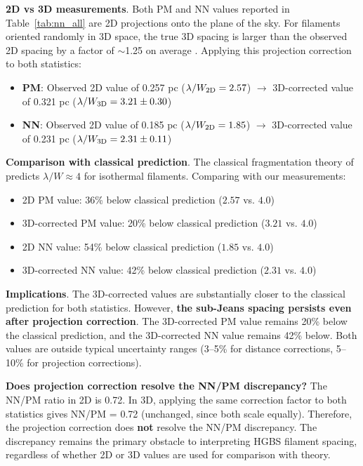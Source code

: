 \documentclass[twoside,twocolumn]{mnras}
\begin{document}
\textbf{2D vs 3D measurements}. Both PM and NN values reported in Table~\ref{tab:nn_all} are 2D projections onto the plane of the sky. For filaments oriented randomly in 3D space, the true 3D spacing is larger than the observed 2D spacing by a factor of $\sim$1.25 on average \citep[Section 3.2]{Hacar2013}. Applying this projection correction to both statistics:

\begin{itemize}
    \item \textbf{PM}: Observed 2D value of 0.257 pc ($\lambda/W_{\rm 2D} = 2.57$) $\rightarrow$ 3D-corrected value of 0.321 pc ($\lambda/W_{\rm 3D} = 3.21 \pm 0.30$)
    \item \textbf{NN}: Observed 2D value of 0.185 pc ($\lambda/W_{\rm 2D} = 1.85$) $\rightarrow$ 3D-corrected value of 0.231 pc ($\lambda/W_{\rm 3D} = 2.31 \pm 0.11$)
\end{itemize}

\textbf{Comparison with classical prediction}. The classical fragmentation theory of \citet{Inutsuka1992} predicts $\lambda/W \approx 4$ for isothermal filaments. Comparing with our measurements:
\begin{itemize}
    \item 2D PM value: 36\% below classical prediction ($2.57$ vs. $4.0$)
    \item 3D-corrected PM value: 20\% below classical prediction ($3.21$ vs. $4.0$)
    \item 2D NN value: 54\% below classical prediction ($1.85$ vs. $4.0$)
    \item 3D-corrected NN value: 42\% below classical prediction ($2.31$ vs. $4.0$)
\end{itemize}

\textbf{Implications}. The 3D-corrected values are substantially closer to the classical prediction for both statistics. However, \textbf{the sub-Jeans spacing persists even after projection correction}. The 3D-corrected PM value remains 20\% below the classical prediction, and the 3D-corrected NN value remains 42\% below. Both values are outside typical uncertainty ranges (3--5\% for distance corrections, 5--10\% for projection corrections).

\textbf{Does projection correction resolve the NN/PM discrepancy?} The NN/PM ratio in 2D is 0.72. In 3D, applying the same correction factor to both statistics gives NN/PM = 0.72 (unchanged, since both scale equally). Therefore, the projection correction does \textbf{not} resolve the NN/PM discrepancy. The discrepancy remains the primary obstacle to interpreting HGBS filament spacing, regardless of whether 2D or 3D values are used for comparison with theory.
\end{document}
